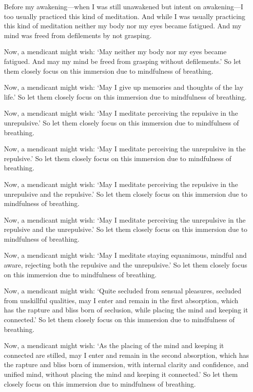 \documentclass[12pt,openany]{book}%
\begin{document}
Before my awakening—when I was still unawakened but intent on awakening—I too usually practiced this kind of meditation. And while I was usually practicing this kind of meditation neither my body nor my eyes became fatigued. And my mind was freed from defilements by not grasping. 

Now, a mendicant might wish: ‘May neither my body nor my eyes became fatigued. And may my mind be freed from grasping without defilements.’ So let them closely focus on this immersion due to mindfulness of breathing. 

Now, a mendicant might wish: ‘May I give up memories and thoughts of the lay life.’ So let them closely focus on this immersion due to mindfulness of breathing. 

Now, a mendicant might wish: ‘May I meditate perceiving the repulsive in the unrepulsive.’ So let them closely focus on this immersion due to mindfulness of breathing. 

Now, a mendicant might wish: ‘May I meditate perceiving the unrepulsive in the repulsive.’ So let them closely focus on this immersion due to mindfulness of breathing. 

Now, a mendicant might wish: ‘May I meditate perceiving the repulsive in the unrepulsive and the repulsive.’ So let them closely focus on this immersion due to mindfulness of breathing. 

Now, a mendicant might wish: ‘May I meditate perceiving the unrepulsive in the repulsive and the unrepulsive.’ So let them closely focus on this immersion due to mindfulness of breathing. 

Now, a mendicant might wish: ‘May I meditate staying equanimous, mindful and aware, rejecting both the repulsive and the unrepulsive.’ So let them closely focus on this immersion due to mindfulness of breathing. 

Now, a mendicant might wish: ‘Quite secluded from sensual pleasures, secluded from unskillful qualities, may I enter and remain in the first absorption, which has the rapture and bliss born of seclusion, while placing the mind and keeping it connected.’ So let them closely focus on this immersion due to mindfulness of breathing. 

Now, a mendicant might wish: ‘As the placing of the mind and keeping it connected are stilled, may I enter and remain in the second absorption, which has the rapture and bliss born of immersion, with internal clarity and confidence, and unified mind, without placing the mind and keeping it connected.’ So let them closely focus on this immersion due to mindfulness of breathing. 
\end{document}
